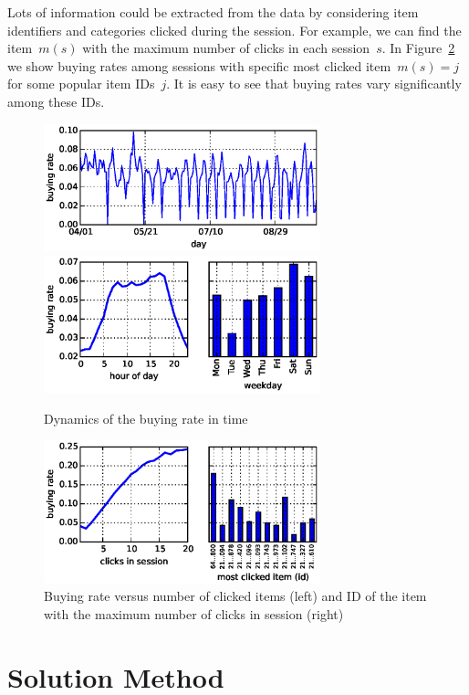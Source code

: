 \documentclass{sig-alternate}
\begin{document}
Lots of information could be extracted from the data by considering
item identifiers and categories clicked during the session.
For example, we can find the item~$m(s)$ with the maximum number of clicks in each session~$s$.
In Figure~\ref{fig:buy-rate-unique-clicked} we show buying rates among sessions with specific
most clicked item~$m(s) = j$ for some popular item IDs~$j$.
It is easy to see that buying rates vary significantly among these IDs.

\begin{figure}
    \caption{Dynamics of the buying rate in time}
    \label{fig:buy-rate-time}
    \includegraphics[width=8cm]{images/dataset_buyrate_day}
    \includegraphics[width=8cm]{images/dataset_buyrate_hour_weekday}
\end{figure}

\begin{figure}
    \caption{Buying rate versus number of clicked items (left) and ID of the item with the maximum number of clicks in session (right)}
    \label{fig:buy-rate-unique-clicked}
    \includegraphics[width=8cm]{images/dataset_buyrate_clicks_items}
\end{figure}


\section{Solution Method}
\label{sec:solution}
\end{document}
